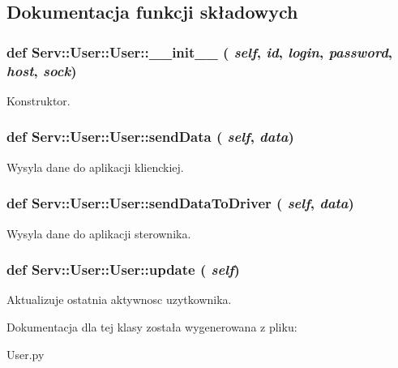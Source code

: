 \subsection{Dokumentacja funkcji składowych}
\hypertarget{class_serv_1_1_user_1_1_user_ae503b7d48b7eb7c8a399f2652a3ff002}{
\subsubsection[{\_\-\_\-init\_\-\_\-}]{\setlength{\rightskip}{0pt plus 5cm}def Serv::User::User::\_\-\_\-init\_\-\_\- ( {\em self}, \/   {\em id}, \/   {\em login}, \/   {\em password}, \/   {\em host}, \/   {\em sock})}}
\label{class_serv_1_1_user_1_1_user_ae503b7d48b7eb7c8a399f2652a3ff002}
\begin{DoxyVerb}Konstruktor.\end{DoxyVerb}
 \hypertarget{class_serv_1_1_user_1_1_user_a2d0441db55283b641079acb8bf67c30a}{
\subsubsection[{sendData}]{\setlength{\rightskip}{0pt plus 5cm}def Serv::User::User::sendData ( {\em self}, \/   {\em data})}}
\label{class_serv_1_1_user_1_1_user_a2d0441db55283b641079acb8bf67c30a}
\begin{DoxyVerb}Wysyla dane do aplikacji klienckiej.\end{DoxyVerb}
 \hypertarget{class_serv_1_1_user_1_1_user_a0907f262b618e5b6c05c6e3584e24b44}{
\subsubsection[{sendDataToDriver}]{\setlength{\rightskip}{0pt plus 5cm}def Serv::User::User::sendDataToDriver ( {\em self}, \/   {\em data})}}
\label{class_serv_1_1_user_1_1_user_a0907f262b618e5b6c05c6e3584e24b44}
\begin{DoxyVerb}Wysyla dane do aplikacji sterownika.\end{DoxyVerb}
 \hypertarget{class_serv_1_1_user_1_1_user_a90697aec786a688ec3308b3ebdcc83a3}{
\subsubsection[{update}]{\setlength{\rightskip}{0pt plus 5cm}def Serv::User::User::update ( {\em self})}}
\label{class_serv_1_1_user_1_1_user_a90697aec786a688ec3308b3ebdcc83a3}
\begin{DoxyVerb}Aktualizuje ostatnia aktywnosc uzytkownika.\end{DoxyVerb}
 

Dokumentacja dla tej klasy została wygenerowana z pliku:\begin{DoxyCompactItemize}
\item 
User.py\end{DoxyCompactItemize}
